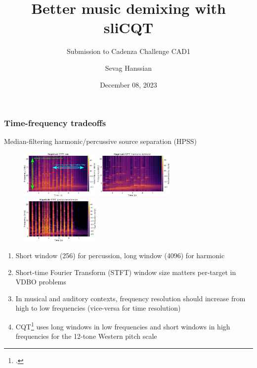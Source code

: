 \documentclass[usenames,dvipsnames]{beamer}
\title{Better music demixing with sliCQT}
\subtitle{Submission to Cadenza Challenge CAD1}
\author{Sevag Hanssian}
\date{December 08, 2023}
\begin{document}
\begin{frame}
\maketitle
\end{frame}

\begin{frame}
	\frametitle{Time-frequency tradeoffs}
	Median-filtering harmonic/percussive source separation (HPSS)
	\begin{figure}[ht]
		\centering
		\vspace{-0.5em}
		\includegraphics[height=2.3cm]{./images/hpss.png}
		\includegraphics[height=2.3cm]{./images/hpss_harm.png}
		\includegraphics[height=2.3cm]{./images/hpss_perc.png}
		\vspace{-0.5em}
	\end{figure}
	\begin{enumerate}
        \item
                Short window (256) for percussion, long window (4096) for harmonic
	\item
		Short-time Fourier Transform (STFT) window size matters per-target in VDBO problems
	\item
		In musical and auditory contexts, frequency resolution should increase from high to low frequencies (vice-versa for time resolution)
	\item
		CQT\footcite{jbrown} uses long windows in low frequencies and short windows in high frequencies for the 12-tone Western pitch scale
	\end{enumerate}

\end{frame}
\end{document}
